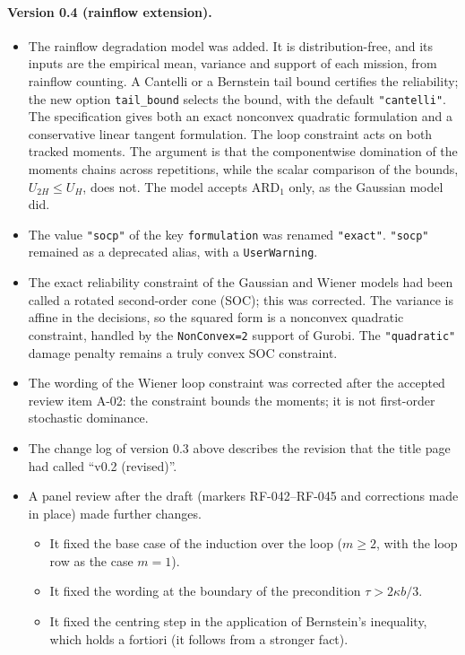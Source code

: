 \documentclass[11pt,a4paper]{article}
\theoremstyle{plain}
\theoremstyle{definition}
\theoremstyle{remark}
\begin{document}
\paragraph{Version 0.4 (rainflow extension).}
\begin{itemize}
  \item The rainflow degradation model was added.
    It is distribution-free, and its inputs are the empirical mean, variance and support of each mission, from rainflow counting.
    A Cantelli or a Bernstein tail bound certifies the reliability; the new option \texttt{tail\_bound} selects the bound, with the default \texttt{"cantelli"}.
    The specification gives both an exact nonconvex quadratic formulation and a conservative linear tangent formulation.
    The loop constraint acts on both tracked moments.
    The argument is that the componentwise domination of the moments chains across repetitions, while the scalar comparison of the bounds, $U_{2H} \le U_H$, does not.
    The model accepts $\text{ARD}_1$ only, as the Gaussian model did.
  \item The value \texttt{"socp"} of the key \texttt{formulation} was renamed \texttt{"exact"}.
    \texttt{"socp"} remained as a deprecated alias, with a \texttt{UserWarning}.
  \item The exact reliability constraint of the Gaussian and Wiener models had been called a rotated second-order cone (SOC); this was corrected.
    The variance is affine in the decisions, so the squared form is a nonconvex quadratic constraint, handled by the \texttt{NonConvex=2} support of Gurobi.
    The \texttt{"quadratic"} damage penalty remains a truly convex SOC constraint.
  \item The wording of the Wiener loop constraint was corrected after the accepted review item A-02: the constraint bounds the moments; it is not first-order stochastic dominance.
  \item The change log of version 0.3 above describes the revision that the title page had called ``v0.2 (revised)''.
  \item A panel review after the draft (markers RF-042--RF-045 and corrections made in place) made further changes.
    \begin{itemize}
      \item It fixed the base case of the induction over the loop ($m \ge 2$, with the loop row as the case $m = 1$).
      \item It fixed the wording at the boundary of the precondition $\tau > 2\kappa b/3$.
      \item It fixed the centring step in the application of Bernstein's inequality, which holds a fortiori (it follows from a stronger fact).

\end{itemize}
\end{itemize}
\end{document}
